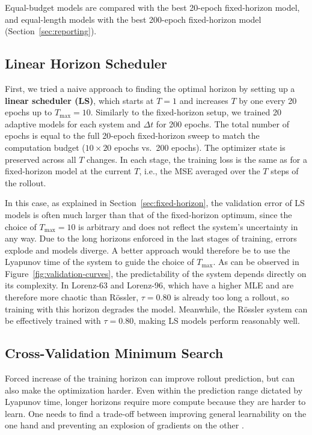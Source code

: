 \documentclass{article}
\begin{document}
Equal-budget models are compared with the best 20-epoch fixed-horizon model, and equal-length models with the best 200-epoch fixed-horizon model (Section~\ref{sec:reporting}).

\subsection{Linear Horizon Scheduler}
\label{sec:ls}

First, we tried a naive approach to finding the optimal horizon by setting up a \textbf{linear scheduler (LS)}, which starts at $T=1$ and increases $T$ by one every 20 epochs up to $T_{\max} = 10$. Similarly to the fixed-horizon setup, we trained 20 adaptive models for each system and $\Delta t$ for 200 epochs. The total number of epochs is equal to the full 20-epoch fixed-horizon sweep to match the computation budget ($10 \times 20$ epochs vs.\ 200 epochs). The optimizer state is preserved across all $T$ changes. In each stage, the training loss is the same as for a fixed-horizon model at the current $T$, i.e., the MSE averaged over the $T$ steps of the rollout.

In this case, as explained in Section~\ref{sec:fixed-horizon}, the validation error of LS models is often much larger than that of the fixed-horizon optimum, since the choice of $T_{\max} = 10$ is arbitrary and does not reflect the system's uncertainty in any way. Due to the long horizons enforced in the last stages of training, errors explode and models diverge. A better approach would therefore be to use the Lyapunov time of the system to guide the choice of $T_{\max}$. As can be observed in Figure~\ref{fig:validation-curves}, the predictability of the system depends directly on its complexity. In Lorenz-63 and Lorenz-96, which have a higher MLE and are therefore more chaotic than Rössler, $\tau = 0.80$ is already too long a rollout, so training with this horizon degrades the model. Meanwhile, the Rössler system can be effectively trained with $\tau = 0.80$, making LS models perform reasonably well.

\subsection{Cross-Validation Minimum Search}
\label{sec:cv}

Forced increase of the training horizon can improve rollout prediction, but can also make the optimization harder. Even within the prediction range dictated by Lyapunov time, longer horizons require more compute because they are harder to learn. One needs to find a trade-off between improving general learnability on the one hand and preventing an explosion of gradients on the other \cite{aceituno_temporal_2025}.
\end{document}
